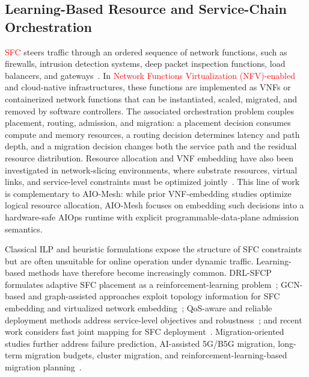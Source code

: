 \documentclass[final,5p]{elsarticle}
\newcommand{\rev}[1]{\textcolor{red}{#1}}
\begin{document}
\subsection{Learning-Based Resource and Service-Chain Orchestration}
\label{subsec:related_learning}

\rev{SFC} steers traffic through an ordered sequence of network functions, such as firewalls, intrusion detection systems, deep packet inspection functions, load balancers, and gateways~\cite{rfc7665}. In \rev{Network Functions Virtualization (NFV)-enabled} and cloud-native infrastructures, these functions are implemented as VNFs or containerized network functions that can be instantiated, scaled, migrated, and removed by software controllers. The associated orchestration problem couples placement, routing, admission, and migration: a placement decision consumes compute and memory resources, a routing decision determines latency and path depth, and a migration decision changes both the service path and the residual resource distribution. Resource allocation and VNF embedding have also been investigated in network-slicing environments, where substrate resources, virtual links, and service-level constraints must be optimized jointly~\cite{jOptimizeSlice24}. This line of work is complementary to AIO-Mesh: while prior VNF-embedding studies optimize logical resource allocation, AIO-Mesh focuses on embedding such decisions into a hardware-safe AIOps runtime with explicit programmable-data-plane admission semantics.

Classical ILP and heuristic formulations expose the structure of SFC constraints but are often unsuitable for online operation under dynamic traffic. Learning-based methods have therefore become increasingly common. DRL-SFCP formulates adaptive SFC placement as a reinforcement-learning problem~\cite{wang2021drl}; GCN-based and graph-assisted approaches exploit topology information for SFC embedding and virtualized network embedding~\cite{xiao2023twostage,pei2025graph,liu2024sfcml}; QoS-aware and reliable deployment methods address service-level objectives and robustness~\cite{taktak2024drl,li2023qosaware,qu2021reliable}; and recent work considers fast joint mapping for SFC deployment~\cite{wu2025drl}. Migration-oriented studies further address failure prediction, AI-assisted 5G/B5G migration, long-term migration budgets, cluster migration, and reinforcement-learning-based migration planning~\cite{zhai2023migration,addad2022ai,qin2023sfcmigrationbudget,afrasiabi2024cluster,zhang2025sfcmigration,hu2026rlpmo}.
\end{document}
